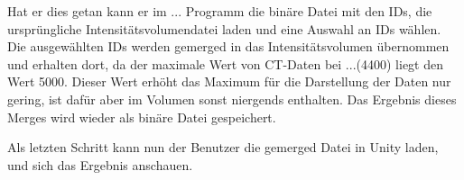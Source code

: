 Hat er dies getan kann er im ... Programm die binäre Datei mit den IDs, die ursprüngliche Intensitätsvolumendatei laden und eine Auswahl an IDs wählen. Die ausgewählten IDs werden gemerged in das Intensitätsvolumen übernommen und erhalten dort, da der maximale Wert von CT-Daten bei ...(4400) liegt  den Wert 5000. Dieser Wert erhöht das Maximum für die Darstellung der Daten nur gering, ist dafür aber im Volumen sonst niergends enthalten. Das Ergebnis dieses Merges wird wieder als binäre Datei gespeichert.

Als letzten Schritt kann nun der Benutzer die gemerged Datei in Unity laden, und sich das Ergebnis anschauen.


